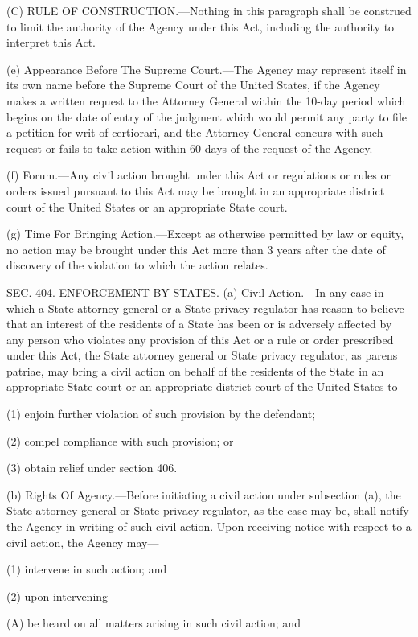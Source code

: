 (C) RULE OF CONSTRUCTION.—Nothing in this paragraph shall be construed to limit the authority of the Agency under this Act, including the authority to interpret this Act.

(e) Appearance Before The Supreme Court.—The Agency may represent itself in its own name before the Supreme Court of the United States, if the Agency makes a written request to the Attorney General within the 10-day period which begins on the date of entry of the judgment which would permit any party to file a petition for writ of certiorari, and the Attorney General concurs with such request or fails to take action within 60 days of the request of the Agency.

(f) Forum.—Any civil action brought under this Act or regulations or rules or orders issued pursuant to this Act may be brought in an appropriate district court of the United States or an appropriate State court.

(g) Time For Bringing Action.—Except as otherwise permitted by law or equity, no action may be brought under this Act more than 3 years after the date of discovery of the violation to which the action relates.


SEC. 404. ENFORCEMENT BY STATES.
(a) Civil Action.—In any case in which a State attorney general or a State privacy regulator has reason to believe that an interest of the residents of a State has been or is adversely affected by any person who violates any provision of this Act or a rule or order prescribed under this Act, the State attorney general or State privacy regulator, as parens patriae, may bring a civil action on behalf of the residents of the State in an appropriate State court or an appropriate district court of the United States to—

(1) enjoin further violation of such provision by the defendant;

(2) compel compliance with such provision; or

(3) obtain relief under section 406.

(b) Rights Of Agency.—Before initiating a civil action under subsection (a), the State attorney general or State privacy regulator, as the case may be, shall notify the Agency in writing of such civil action. Upon receiving notice with respect to a civil action, the Agency may—

(1) intervene in such action; and

(2) upon intervening—

(A) be heard on all matters arising in such civil action; and

